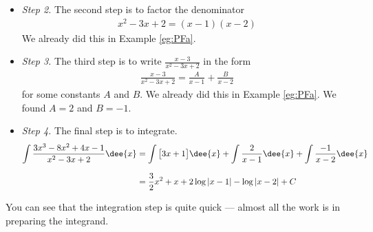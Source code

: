 \begin{eg}
\begin{itemize}
\item \emph{Step 2.}
The second step is to factor the denominator
\begin{align*}
x^2-3x+2=(x-1)(x-2)
\end{align*}
We already did this in Example \ref{eg:PFa}.

\item \emph{Step 3.}
The third step is to write $\frac{x-3}{x^2-3x+2}$
in the form
\begin{align*}
\frac{x-3}{x^2-3x+2}
=\frac{A}{x-1}+\frac{B}{x-2}
\end{align*}
for some constants $A$ and $B$. We already did this in Example \ref{eg:PFa}.
We found $A=2$ and $B=-1$.

\item \emph{Step 4.}
 The final step is to integrate.
\begin{align*}
\int\frac{3x^3-8x^2+4x-1}{x^2-3x+2}\dee{x}
&=\int\big[3x+1\big]\dee{x}
   + \int \frac{2}{x-1}\dee{x} +\int \frac{-1}{x-2}\dee{x} \\[0.1in]
&=\frac{3}{2}x^2+x+ 2\log|x-1|-\log|x-2|+C
\end{align*}
\end{itemize}
You can see that the integration step is quite quick --- almost all the work is in
preparing the integrand.
\end{eg}

